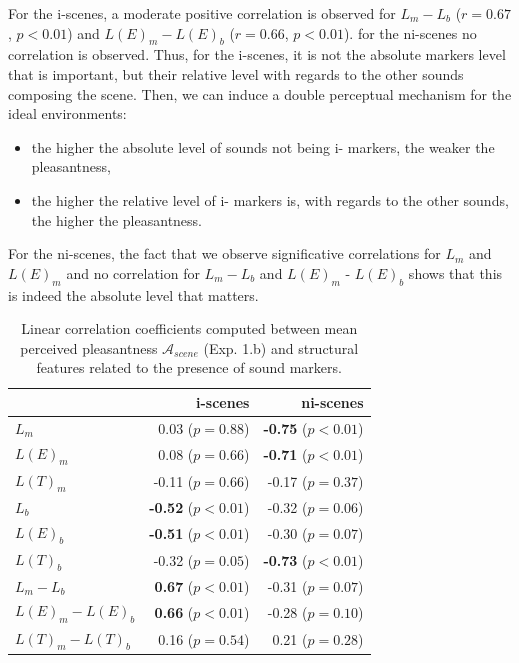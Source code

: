 \documentclass[preprint,12pt]{elsarticle}
\begin{document}
For the i-scenes, a moderate positive correlation is observed for $L_m-L_b$ ($r=0.67$, $p<0.01$) and $L(E)_m-L(E)_b$ ($r=0.66$, $p<0.01$). for the ni-scenes no correlation is observed. Thus, for the i-scenes, it is not the absolute markers level that is important, but their relative level with regards to the other sounds composing the scene. Then, we can induce a double perceptual mechanism for the ideal environments:

\begin{itemize}
\item the higher the absolute level of sounds not being i- markers, the weaker the pleasantness,
\item the higher the relative level of i- markers is, with regards to the other sounds, the higher the pleasantness.
\end{itemize}

For the ni-scenes, the fact that we observe significative correlations for $L_m$ and $L(E)_m$ and no correlation for $L_m-L_b$ and $L(E)_m$ - $L(E)_b$ shows that this is indeed the absolute level that matters.

\begin{table}[t]
\setlength{\tabcolsep}{3pt}
\centering
{\renewcommand{\arraystretch}{1}
\centering
\begin{tabular}{l r r}
                  &   i-scenes                  & ni-scenes \\
\hline
$L_m$              & 0.03  ($p=0.88$)           & \textbf{-0.75} ($p<0.01$) \\
$L(E)_m$           & 0.08  ($p=0.66$)           & \textbf{-0.71} ($p<0.01$) \\
$L(T)_m$           & -0.11 ($p=0.66$)           & -0.17 ($p=0.37$) \\
$L_b$              & \textbf{-0.52} ($p<0.01$)  & -0.32 ($p=0.06$) \\
$L(E)_b$           & \textbf{-0.51} ($p<0.01$)  & -0.30 ($p=0.07$) \\
$L(T)_b$           & -0.32 ($p=0.05$)           & \textbf{-0.73} ($p<0.01$) \\
$L_m-L_b$          & \textbf{0.67} ($p<0.01$)   & -0.31 ($p=0.07$) \\
$L(E)_m-L(E)_b$    & \textbf{0.66} ($p<0.01$)   & -0.28 ($p=0.10$) \\
$L(T)_m-L(T)_b$    & 0.16 ($p=0.54$)            & 0.21 ($p=0.28$) \\
\hline
\end{tabular}
}
\vspace{0.5mm}
\caption{Linear correlation coefficients computed between mean perceived pleasantness $\mathcal{A}_{scene}$ (Exp. 1.b) and structural features related to the presence of sound markers.}
\label{tab:corrMarkers}
\end{table}
\end{document}
